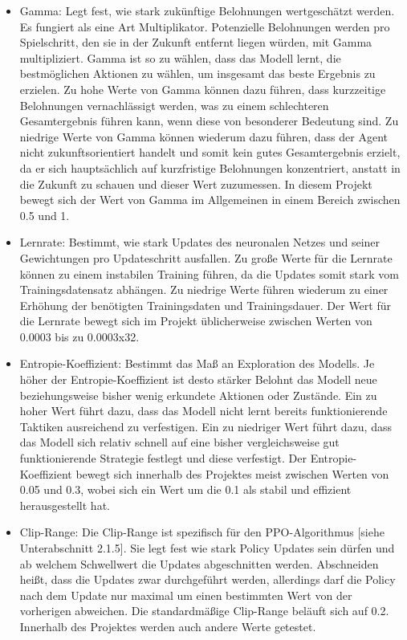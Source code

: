 \begin{itemize} 
\item Gamma: Legt fest, wie stark zukünftige Belohnungen wertgeschätzt werden. Es fungiert als eine Art Multiplikator. Potenzielle Belohnungen werden pro Spielschritt, den sie in der Zukunft entfernt liegen würden, mit Gamma multipliziert. Gamma ist so zu wählen, dass das Modell lernt, die bestmöglichen Aktionen zu wählen, um insgesamt das beste Ergebnis zu erzielen. Zu hohe Werte von Gamma können dazu führen, dass kurzzeitige Belohnungen vernachlässigt werden, was zu einem schlechteren Gesamtergebnis führen kann, wenn diese von besonderer Bedeutung sind. Zu niedrige Werte von Gamma können wiederum dazu führen, dass der Agent nicht zukunftsorientiert handelt und somit kein gutes Gesamtergebnis erzielt, da er sich hauptsächlich auf kurzfristige Belohnungen konzentriert, anstatt in die Zukunft zu schauen und dieser Wert zuzumessen. In diesem Projekt bewegt sich der Wert von Gamma im Allgemeinen in einem Bereich zwischen 0.5 und 1.

\item Lernrate: Bestimmt, wie stark Updates des neuronalen Netzes und seiner Gewichtungen pro Updateschritt ausfallen. Zu große Werte für die Lernrate können zu einem instabilen Training führen, da die Updates somit stark vom Trainingsdatensatz abhängen. Zu niedrige Werte führen wiederum zu einer Erhöhung der benötigten Trainingsdaten und Trainingsdauer. Der Wert für die Lernrate bewegt sich im Projekt üblicherweise zwischen Werten von 0.0003 bis zu 0.0003x32.

\item Entropie-Koeffizient: Bestimmt das Maß an Exploration des Modells. Je höher der Entropie-Koeffizient ist desto stärker Belohnt das Modell neue beziehungsweise bisher wenig erkundete Aktionen oder Zustände. Ein zu hoher Wert führt dazu, dass das Modell nicht lernt bereits funktionierende Taktiken ausreichend zu verfestigen. Ein zu niedriger Wert führt dazu, dass das Modell sich relativ schnell auf eine bisher vergleichsweise gut funktionierende Strategie festlegt und diese verfestigt. Der Entropie-Koeffizient bewegt sich innerhalb des Projektes meist zwischen Werten von 0.05 und 0.3, wobei sich ein Wert um die 0.1 als stabil und effizient herausgestellt hat.

\item Clip-Range: Die Clip-Range ist spezifisch für den PPO-Algorithmus [siehe Unterabschnitt 2.1.5]. Sie legt fest wie stark Policy Updates sein dürfen und ab welchem Schwellwert die Updates abgeschnitten werden. Abschneiden heißt, dass die Updates zwar durchgeführt werden, allerdings darf die Policy nach dem Update nur maximal um einen bestimmten Wert von der vorherigen abweichen. Die standardmäßige Clip-Range beläuft sich auf 0.2. Innerhalb des Projektes werden auch andere Werte getestet.


\end{itemize}
